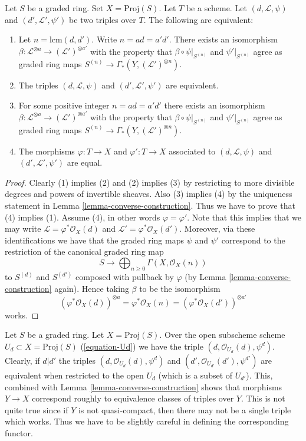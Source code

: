 \begin{lemma}
\label{lemma-equivalent}
Let $S$ be a graded ring. Set $X = \text{Proj}(S)$. Let $T$ be a scheme.
Let $(d, \mathcal{L}, \psi)$ and $(d', \mathcal{L}', \psi')$
be two triples over $T$. The following are equivalent:
\begin{enumerate}
\item Let $n = \text{lcm}(d, d')$. Write $n = ad = a'd'$. There exists
an isomorphism
$\beta : \mathcal{L}^{\otimes a} \to (\mathcal{L}')^{\otimes a'}$
with the property that
$\beta \circ \psi|_{S^{(n)}}$ and $\psi'|_{S^{(n)}}$ agree
as graded ring maps $S^{(n)} \to \Gamma_*(Y, (\mathcal{L}')^{\otimes n})$.
\item The triples $(d, \mathcal{L}, \psi)$ and $(d', \mathcal{L}', \psi')$
are equivalent.
\item For some positive integer $n = ad = a'd'$ there exists
an isomorphism
$\beta : \mathcal{L}^{\otimes a} \to (\mathcal{L}')^{\otimes a'}$
with the property that
$\beta \circ \psi|_{S^{(n)}}$ and $\psi'|_{S^{(n)}}$ agree
as graded ring maps $S^{(n)} \to \Gamma_*(Y, (\mathcal{L}')^{\otimes n})$.
\item The morphisms $\varphi : T \to X$ and $\varphi' : T \to X$
associated to $(d, \mathcal{L}, \psi)$ and $(d', \mathcal{L}', \psi')$
are equal.
\end{enumerate}
\end{lemma}

\begin{proof}
Clearly (1) implies (2) and (2) implies (3) by restricting to
more divisible degrees and powers of invertible sheaves.
Also (3) implies (4) by the uniqueness statement
in Lemma \ref{lemma-converse-construction}.
Thus we have to prove that (4) implies (1). Assume (4),
in other words $\varphi = \varphi'$.
Note that this implies that we may write
$\mathcal{L} = \varphi^*\mathcal{O}_X(d)$ and
$\mathcal{L}' = \varphi^*\mathcal{O}_X(d')$.
Moreover, via these identifications we have that the graded ring
maps $\psi$ and $\psi'$ correspond to the restriction of the canonical
graded ring map
$$
S \longrightarrow \bigoplus\nolimits_{n \geq 0} \Gamma(X, \mathcal{O}_X(n))
$$
to $S^{(d)}$ and $S^{(d')}$ composed with pullback by $\varphi$
(by Lemma \ref{lemma-converse-construction} again). Hence taking
$\beta$ to be the isomorphism
$$
(\varphi^*\mathcal{O}_X(d))^{\otimes a} =
\varphi^*\mathcal{O}_X(n) =
(\varphi^*\mathcal{O}_X(d'))^{\otimes a'}
$$
works.
\end{proof}

\noindent
Let $S$ be a graded ring.
Let $X = \text{Proj}(S)$.
Over the open subscheme scheme $U_d \subset X = \text{Proj}(S)$
(\ref{equation-Ud}) we have the triple
$(d, \mathcal{O}_{U_d}(d), \psi^d)$. Clearly, if $d | d'$ the triples
$(d, \mathcal{O}_{U_d}(d), \psi^d)$ and
$(d', \mathcal{O}_{U_{d'}}(d'), \psi^{d'})$ are equivalent
when restricted to the open $U_d$ (which is a subset of $U_{d'}$).
This, combined with Lemma \ref{lemma-converse-construction} shows
that morphisms $Y \to X$ correspond roughly to
equivalence classes of triples over $Y$. This is not quite true since if $Y$ is
not quasi-compact, then there may not be a single triple which works.
Thus we have to be slightly careful in defining the corresponding functor.

